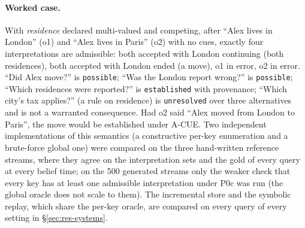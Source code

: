\paragraph{Worked case.} With \emph{residence} declared multi-valued and competing, after ``Alex lives in London'' (o1) and ``Alex lives in Paris'' (o2) with no cues, exactly four interpretations are admissible: both accepted with London continuing (both residences), both accepted with London ended (a move), o1 in error, o2 in error. ``Did Alex move?'' is \texttt{possible}; ``Was the London report wrong?'' is \texttt{possible}; ``Which residences were reported?'' is \texttt{established} with provenance; ``Which city's tax applies?'' (a rule on residence) is \texttt{unresolved} over three alternatives and is not a warranted consequence. Had o2 said ``Alex moved from London to Paris'', the move would be established under A-CUE. Two independent implementations of this semantics (a constructive per-key enumeration and a brute-force global one) were compared on the three hand-written reference streams, where they agree on the interpretation sets and the gold of every query at every belief time; on the 500 generated streams only the weaker check that every key has at least one admissible interpretation under P0c was run (the global oracle does not scale to them). The incremental store and the symbolic replay, which share the per-key oracle, are compared on every query of every setting in \S\ref{sec:res-systems}.

